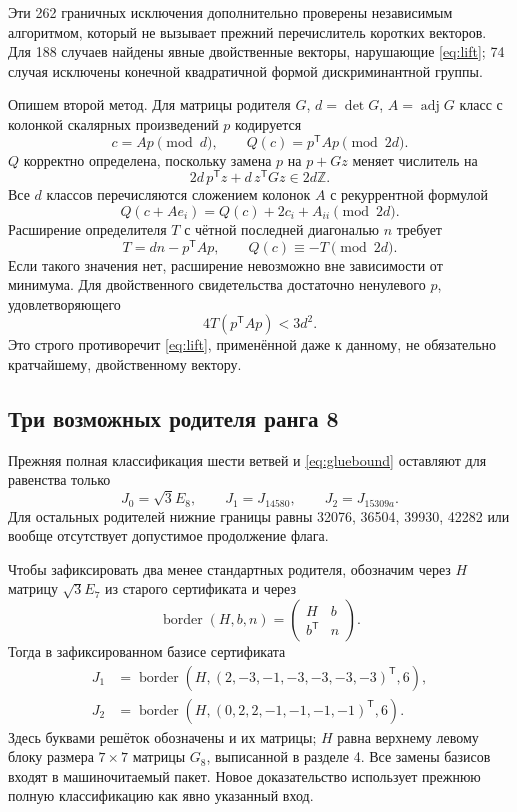 \documentclass[11pt,a4paper]{article}
\theoremstyle{remark}\newtheorem{remark}[theorem]{Замечание}
\newcommand{\Z}{\mathbb Z}\newcommand{\R}{\mathbb R}\newcommand{\F}{\mathbb F}
\begin{document}
Эти 262 граничных исключения дополнительно проверены независимым алгоритмом, который не вызывает прежний перечислитель коротких векторов. Для 188 случаев найдены явные двойственные векторы, нарушающие \eqref{eq:lift}; 74 случая исключены конечной квадратичной формой дискриминантной группы.

Опишем второй метод. Для матрицы родителя $G$, $d=\det G$, $A=\operatorname{adj}G$ класс с колонкой скалярных произведений $p$ кодируется
\[
c=Ap\pmod d,\qquad Q(c)=p^{\mathsf T}Ap\pmod{2d}.
\]
$Q$ корректно определена, поскольку замена $p$ на $p+Gz$ меняет числитель на
\[
2d\,p^{\mathsf T}z+d\,z^{\mathsf T}Gz\in2d\Z.
\]
Все $d$ классов перечисляются сложением колонок $A$ с рекуррентной формулой
\[
Q(c+Ae_i)=Q(c)+2c_i+A_{ii}\pmod{2d}.
\]
Расширение определителя $T$ с чётной последней диагональю $n$ требует
\[
T=dn-p^{\mathsf T}Ap,\qquad Q(c)\equiv-T\pmod{2d}.
\]
Если такого значения нет, расширение невозможно вне зависимости от минимума. Для двойственного свидетельства достаточно ненулевого $p$, удовлетворяющего
\[
4T(p^{\mathsf T}Ap)<3d^2.
\]
Это строго противоречит \eqref{eq:lift}, применённой даже к данному, не обязательно кратчайшему, двойственному вектору.

\subsection{Три возможных родителя ранга 8}

Прежняя полная классификация шести ветвей и \eqref{eq:gluebound} оставляют для равенства только
\[
J_0=\sqrt3E_8,\qquad J_1=J_{14580},\qquad J_2=J_{15309a}.
\]
Для остальных родителей нижние границы равны 32076, 36504, 39930, 42282 или вообще отсутствует допустимое продолжение флага.

Чтобы зафиксировать два менее стандартных родителя, обозначим через $H$ матрицу $\sqrt3E_7$ из старого сертификата и через
\[
\operatorname{border}(H,b,n)=\begin{pmatrix}H&b\\b^{\mathsf T}&n\end{pmatrix}.
\]
Тогда в зафиксированном базисе сертификата
\begin{align*}
J_1&=\operatorname{border}(H,(2,-3,-1,-3,-3,-3,-3)^{\mathsf T},6),\\
J_2&=\operatorname{border}(H,(0,2,2,-1,-1,-1,-1)^{\mathsf T},6).
\end{align*}
Здесь буквами решёток обозначены и их матрицы; $H$ равна верхнему левому блоку размера $7\times7$ матрицы $G_8$, выписанной в разделе 4. Все замены базисов входят в машиночитаемый пакет. Новое доказательство использует прежнюю полную классификацию как явно указанный вход.
\end{document}

